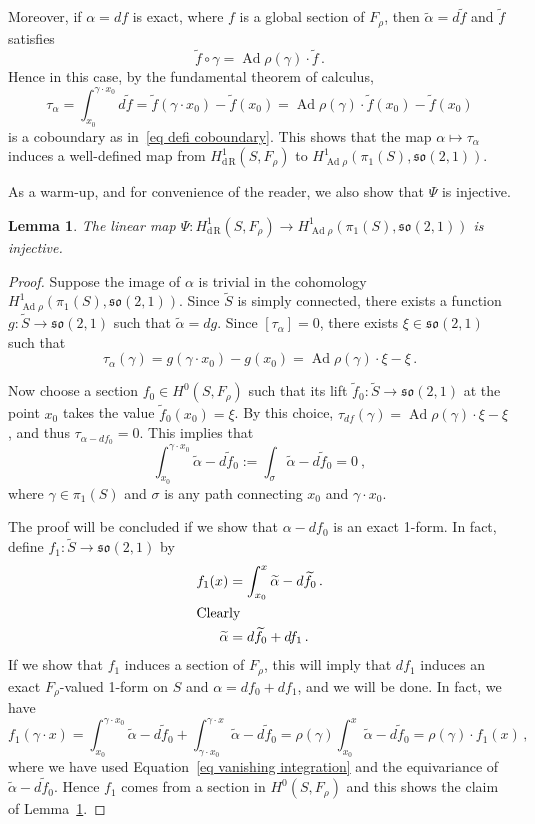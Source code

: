 \documentclass[11pt]{article}
\newtheorem{lemm}[theo]{Lemma}
\theoremstyle{definition}
\numberwithin{equation}{section}
\numberwithin{figure}{section}
\numberwithin{table}{section}
\newcommand{\so}{\mathfrak{so}}
\DeclareMathOperator{\Ad}{Ad}
\DeclareMathOperator{\rham}{d\! R}
\begin{document}
Moreover, if $\alpha=df$ is exact, where $f$ is a global section of $F_\rho$, then $\widetilde\alpha=d\widetilde f$ and $\widetilde f$ satisfies
\[
\widetilde f\circ \gamma=\Ad\rho(\gamma)\cdot \widetilde f\,.
\]
Hence in this case, by the fundamental theorem of calculus,
\[
\tau_\alpha=\int_{x_0}^{\gamma\cdot x_0}d\widetilde f=\widetilde f(\gamma\cdot x_0)-\widetilde f(x_0)=\Ad\rho(\gamma)\cdot \widetilde f(x_0)-\widetilde f(x_0)
\]
is a coboundary as in~\eqref{eq defi coboundary}. This shows that the map $\alpha\mapsto\tau_\alpha$ induces a well-defined map from $H^1_{\rham}(S,F_\rho)$ to $H^1_{\Ad\rho}(\pi_1(S),\so(2,1))$.

As a warm-up, and for convenience of the reader, we also show that $\Psi$ is injective.

\begin{lemm}\label{lemm6.1}
The linear map $\Psi:H^1_{\rham}(S,F_\rho)\to H^1_{\Ad\rho}(\pi_1(S),\so(2,1))$ is injective.
\end{lemm}


\begin{proof}
Suppose the image of $\alpha$ is trivial in the cohomology $H^1_{\Ad\rho}(\pi_1(S),\so(2,1))$. Since $\widetilde S$ is simply connected, there exists a function $g:\widetilde S\to\so(2,1)$ such that $\widetilde \alpha=dg$. Since $[\tau_\alpha]=0$, there exists $\xi\in\so(2,1)$ such that
\[
\tau_\alpha(\gamma)=g(\gamma\cdot x_0)-g(x_0)=\Ad\rho(\gamma)\cdot \xi-\xi\,.
\]

Now choose a section $f_0\in H^0(S,F_\rho)$ such that its lift $\widetilde f_0:\widetilde S\to\so(2,1)$ at the point $x_0$ takes the value $\widetilde f_0(x_0)=\xi$. By this choice, $\tau_{df}(\gamma)=\Ad\rho(\gamma)\cdot \xi-\xi$, and thus $\tau_{\alpha-df_0}=0$. This implies that
\begin{equation}\label{eq vanishing integration}
\int_{x_0}^{\gamma\cdot x_0}\widetilde\alpha-d\widetilde f_0:=\int_\sigma \widetilde\alpha-d\widetilde f_0=0~,
\end{equation}
where $\gamma\in\pi_1(S)$ and $\sigma$ is any path connecting $x_0$ and $\gamma\cdot x_0$.

The proof will be concluded if we show that $\alpha-df_0$ is an exact 1-form. In fact, define $f_1:\widetilde S\to\so(2,1)$ by
\begin{align*}
f_1(x)&=\int_{x_0}^{x} \widetilde\alpha-d\widetilde f_0\,.\\
\intertext{Clearly}
\widetilde \alpha &=d\widetilde f_0+d f_1\,.
\end{align*}
If we show that $f_1$ induces a section of $F_\rho$, this will imply that $df_1$ induces an exact $F_\rho$-valued 1-form on $S$ and $\alpha=df_0+df_1$, and we will be done. In fact, we have
\[
f_1(\gamma\cdot x)=\int^{\gamma\cdot x_0}_{x_0}\widetilde\alpha-d\widetilde f_0+\int^{\gamma\cdot x}_{\gamma\cdot x_0}\widetilde\alpha-d\widetilde f_0=\rho(\gamma) \int^{x}_{x_0}\widetilde\alpha-d\widetilde f_0=\rho(\gamma)\cdot f_1(x)\,,
\]
where we have used Equation~\eqref{eq vanishing integration} and the equivariance of $\widetilde \alpha-d\widetilde f_0$. Hence $f_1$ comes from a section in $H^0(S,F_\rho)$ and this shows the claim of Lemma~\ref{lemm6.1}.
\end{proof}
\end{document}
